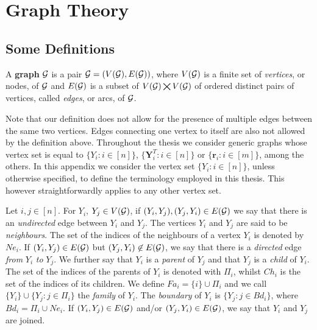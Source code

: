 
\chapter{Graph Theory} %

\label{appendixB} %


\section{Some Definitions}
\begin{definition}
A \textbf{graph} $\mathcal{G}$ is a pair $\mathcal{G}=(V(\mathcal{G}), E(\mathcal{G}))$, where $V(\mathcal{G})$ is a finite set of \emph{vertices}, or nodes, of $\mathcal{G}$ and $E(\mathcal{G})$ is a subset of $V(\mathcal{G})\bigtimes V(\mathcal{G})$ of ordered distinct pairs of vertices, called \emph{edges}, or arcs, of $\mathcal{G}$.
\end{definition}
Note that our definition does not allow for the presence of multiple edges between the same two vertices. Edges connecting one vertex to itself are also not allowed by the definition above. Throughout the thesis we consider generic graphs whose vertex set is equal to $\{Y_i: i \in[n]\}$, $\{\bm{Y}_i^T: i\in[n]\}$ or $\{\bm{r}_i: i\in[m]\}$, among the others. In this appendix we  consider the vertex set $\{Y_i:i\in[n]\}$, unless otherwise specified, to define the terminology employed in this thesis. This however straightforwardly applies to any other vertex set.

Let $i,j\in[n]$. For $Y_i$, $Y_j\in V(\mathcal{G})$, if $(Y_i,Y_j),(Y_j,Y_i)\in E(\mathcal{G})$ we say that there is an \textit{undirected} edge between $Y_i$ and $Y_j$. The vertices $Y_i$ and $Y_j$ are said to be \textit{neighbours}. The set of the indices of the neighbours of a vertex $Y_i$ is denoted by $Ne_i$. If $(Y_i,Y_j)\in E(\mathcal{G})$ but $(Y_j,Y_i)\not\in E(\mathcal{G})$, we say that there is a \textit{directed} edge \textit{from} $Y_i$ \textit{to} $Y_j$. We further say that $Y_i$ is a \textit{parent} of $Y_j$ and that $Y_j$ is a \textit{child} of $Y_i$. The set of the indices of the parents of $Y_i$ is denoted with $\Pi_i$, whilst $Ch_i$ is the set of the indices of its children. We define $Fa_i=\{i\}\cup \Pi_i$ and we call $\{Y_i\}\cup \{Y_j:j\in\Pi_i\}$ the \textit{family} of $Y_i$. The \textit{boundary} of $Y_i$ is $\{Y_j:j\in Bd_i\}$, where $Bd_i=\Pi_i\cup Ne_i$. If $(Y_i,Y_j)\in E(\mathcal{G})$ and/or $(Y_j,Y_i)\in E(\mathcal{G})$, we say that $Y_i$ and $Y_j$ are joined.

